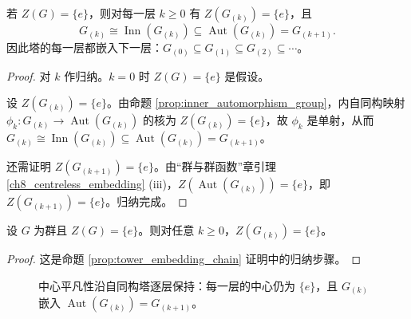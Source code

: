 \begin{proposition}[自同构塔的嵌入链]\label{prop:tower_embedding_chain}
若 $Z(G)=\{e\}$，则对每一层 $k\ge 0$ 有 $Z(G_{(k)})=\{e\}$，且
\[
G_{(k)} \cong \operatorname{Inn}(G_{(k)}) \subseteq \operatorname{Aut}(G_{(k)}) = G_{(k+1)}.
\]
因此塔的每一层都嵌入下一层：$G_{(0)} \subseteq G_{(1)} \subseteq G_{(2)} \subseteq \cdots$。
\end{proposition}

\begin{proof}
对 $k$ 作归纳。$k=0$ 时 $Z(G)=\{e\}$ 是假设。

设 $Z(G_{(k)})=\{e\}$。由命题 \ref{prop:inner_automorphism_group}，内自同构映射 $\phi_k: G_{(k)} \to \operatorname{Aut}(G_{(k)})$ 的核为 $Z(G_{(k)})=\{e\}$，故 $\phi_k$ 是单射，从而 $G_{(k)} \cong \operatorname{Inn}(G_{(k)}) \subseteq \operatorname{Aut}(G_{(k)}) = G_{(k+1)}$。

还需证明 $Z(G_{(k+1)})=\{e\}$。由“群与群函数”章引理 \ref{ch8_centreless_embedding} (iii)，$Z(\operatorname{Aut}(G_{(k)}))=\{e\}$，即 $Z(G_{(k+1)})=\{e\}$。归纳完成。
\end{proof}

\begin{lemma}[中心平凡性的逐层保持]\label{ch10_centreless_preserved}
设 $G$ 为群且 $Z(G)=\{e\}$。则对任意 $k\ge 0$，$Z(G_{(k)})=\{e\}$。
\end{lemma}

\begin{proof}
这是命题 \ref{prop:tower_embedding_chain} 证明中的归纳步骤。
\end{proof}

\begin{figure}[htbp]
\centering
{}
\caption{中心平凡性沿自同构塔逐层保持：每一层的中心仍为 $\{e\}$，且 $G_{(k)}$ 嵌入 $\operatorname{Aut}(G_{(k)})=G_{(k+1)}$。}
\label{fig:centreless_tower}
\end{figure}

